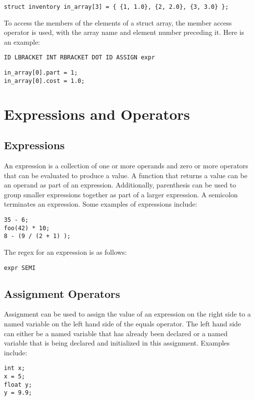 \documentclass{article}
\begin{document}
 \begin{lstlisting}
struct inventory in_array[3] = { {1, 1.0}, {2, 2.0}, {3, 3.0} };
\end{lstlisting}

To access the members of the elements of a struct array, the member access operator is used, with the array name and element number preceding it. Here is an example:

\begin{Verbatim}[frame=single]
ID LBRACKET INT RBRACKET DOT ID ASSIGN expr
\end{Verbatim}

 \begin{lstlisting}
in_array[0].part = 1;
in_array[0].cost = 1.0;
\end{lstlisting}

\section{Expressions and Operators}

\subsection{Expressions}
An expression is a collection of one or more operands and zero or more operators that can be evaluated to produce a value.  A function that returns a value can be an operand as part of an expression.  Additionally, parenthesis can be used to group smaller expressions together as part of a larger expression.  A semicolon terminates an expression.  Some examples of expressions include:
\begin{lstlisting}
35 - 6;
foo(42) * 10;
8 - (9 / (2 + 1) );
\end{lstlisting}

The regex for an expression is as follows:
\begin{Verbatim}[frame=single]
expr SEMI
\end{Verbatim}

\subsection{Assignment Operators}
Assignment can be used to assign the value of an expression on the right side to a named variable on the left hand side of the equals operator.  The left hand side can either be a named variable that has already been declared or a named variable that is being declared and initialized in this assignment.  Examples include:
\begin{lstlisting}
int x;
x = 5;
float y;
y = 9.9;
\end{lstlisting}
\end{document}
